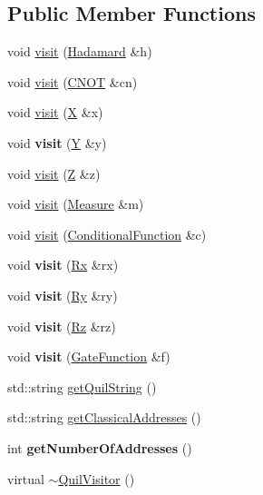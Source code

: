 \subsection*{Public Member Functions}
\begin{DoxyCompactItemize}
\item 
void \hyperlink{a00051_a5470d573fdcfd691c100fcbfeeed45db}{visit} (\hyperlink{a00036}{Hadamard} \&h)
\item 
void \hyperlink{a00051_ac51ed9d947d3fa00525eb79b2bbc9021}{visit} (\hyperlink{a00019}{C\+N\+OT} \&cn)
\item 
void \hyperlink{a00051_a0b1a31a900f87a3f91f640ab5caec126}{visit} (\hyperlink{a00070}{X} \&x)
\item 
void {\bfseries visit} (\hyperlink{a00075}{Y} \&y)\hypertarget{a00051_a403f2d506425ee5a0098b1b54de7e4e8}{}\label{a00051_a403f2d506425ee5a0098b1b54de7e4e8}

\item 
void \hyperlink{a00051_af429121067a397eeac17328fc0244859}{visit} (\hyperlink{a00076}{Z} \&z)
\item 
void \hyperlink{a00051_acbe2afe1c9741112d1f9196681f8b896}{visit} (\hyperlink{a00045}{Measure} \&m)
\item 
void \hyperlink{a00051_a7665ecdf9984374f52d30d7767649cf9}{visit} (\hyperlink{a00021}{Conditional\+Function} \&c)
\item 
void {\bfseries visit} (\hyperlink{a00061}{Rx} \&rx)\hypertarget{a00051_a81a75fb24d368aeb8396d2cbde0bbfb4}{}\label{a00051_a81a75fb24d368aeb8396d2cbde0bbfb4}

\item 
void {\bfseries visit} (\hyperlink{a00062}{Ry} \&ry)\hypertarget{a00051_ad74c7ec734670c2a5478ebb40e097bfc}{}\label{a00051_ad74c7ec734670c2a5478ebb40e097bfc}

\item 
void {\bfseries visit} (\hyperlink{a00063}{Rz} \&rz)\hypertarget{a00051_aa3823bdeb4d930f753d4b421730c5912}{}\label{a00051_aa3823bdeb4d930f753d4b421730c5912}

\item 
void {\bfseries visit} (\hyperlink{a00032}{Gate\+Function} \&f)\hypertarget{a00051_addedb7635dd200885904611e4cae39d4}{}\label{a00051_addedb7635dd200885904611e4cae39d4}

\item 
std\+::string \hyperlink{a00051_a9808ecc5766ea2c387107dff6b64cdb8}{get\+Quil\+String} ()
\item 
std\+::string \hyperlink{a00051_ab4a1c6a92772a09c22068ced7d3dc76c}{get\+Classical\+Addresses} ()
\item 
int {\bfseries get\+Number\+Of\+Addresses} ()\hypertarget{a00051_a561aabf6de48ae9aee4fbe868f1c5da1}{}\label{a00051_a561aabf6de48ae9aee4fbe868f1c5da1}

\item 
virtual \hyperlink{a00051_a90dcced4e75c7b45c287fb4edc58ed01}{$\sim$\+Quil\+Visitor} ()
\end{DoxyCompactItemize}

